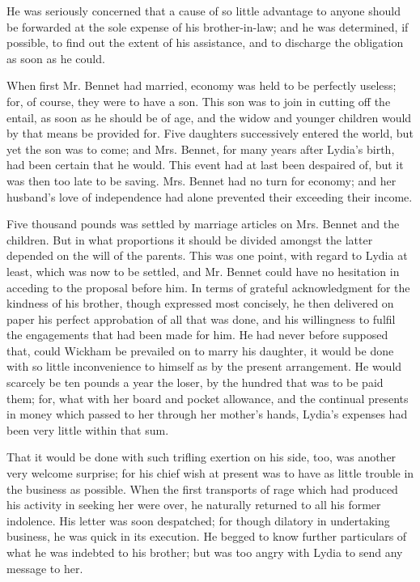 He was seriously concerned that a cause of so little advantage to anyone should be forwarded at the sole expense of his brother-in-law; and he was determined, if possible, to find out the extent of his assistance, and to discharge the obligation as soon as he could.

When first Mr. Bennet had married, economy was held to be perfectly useless; for, of course, they were to have a son. This son was to join in cutting off the entail, as soon as he should be of age, and the widow and younger children would by that means be provided for. Five daughters successively entered the world, but yet the son was to come; and Mrs. Bennet, for many years after Lydia's birth, had been certain that he would. This event had at last been despaired of, but it was then too late to be saving. Mrs. Bennet had no turn for economy; and her husband's love of independence had alone prevented their exceeding their income.

Five thousand pounds was settled by marriage articles on Mrs. Bennet and the children. But in what proportions it should be divided amongst the latter depended on the will of the parents. This was one point, with regard to Lydia at least, which was now to be settled, and Mr. Bennet could have no hesitation in acceding to the proposal before him. In terms of grateful acknowledgment for the kindness of his brother, though expressed most concisely, he then delivered on paper his perfect approbation of all that was done, and his willingness to fulfil the engagements that had been made for him. He had never before supposed that, could Wickham be prevailed on to marry his daughter, it would be done with so little inconvenience to himself as by the present arrangement. He would scarcely be ten pounds a year the loser, by the hundred that was to be paid them; for, what with her board and pocket allowance, and the continual presents in money which passed to her through her mother's hands, Lydia's expenses had been very little within that sum.

That it would be done with such trifling exertion on his side, too, was another very welcome surprise; for his chief wish at present was to have as little trouble in the business as possible. When the first transports of rage which had produced his activity in seeking her were over, he naturally returned to all his former indolence. His letter was soon despatched; for though dilatory in undertaking business, he was quick in its execution. He begged to know further particulars of what he was indebted to his brother; but was too angry with Lydia to send any message to her.

